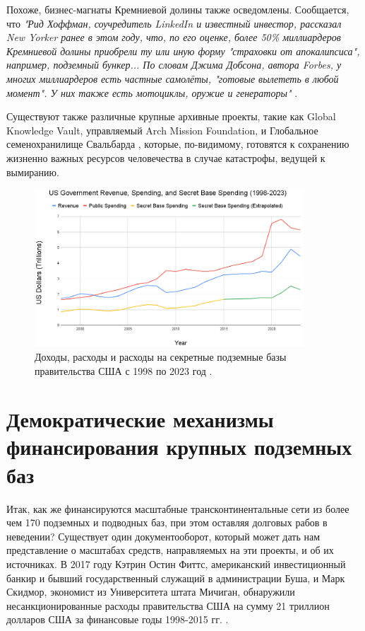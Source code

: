 \documentclass[10pt,twocolumn,letterpaper]{article}
\begin{document}
Похоже, бизнес-магнаты Кремниевой долины также осведомлены. Сообщается, что \textit{"Рид Хоффман, соучредитель LinkedIn и известный инвестор, рассказал New Yorker ранее в этом году, что, по его оценке, более 50\% миллиардеров Кремниевой долины приобрели ту или иную форму "страховки от апокалипсиса", например, подземный бункер... По словам Джима Добсона, автора Forbes, у многих миллиардеров есть частные самолёты, "готовые вылететь в любой момент". У них также есть мотоциклы, оружие и генераторы"} \cite{28}.

Существуют также различные крупные архивные проекты, такие как Global Knowledge Vault, управляемый Arch Mission Foundation, \cite{29} и Глобальное семенохранилище Свальбарда \cite{30}, которые, по-видимому, готовятся к сохранению жизненно важных ресурсов человечества в случае катастрофы, ведущей к вымиранию.
\begin{figure}[t]
\begin{center}
\includegraphics[width=0.9\textwidth]{govcrop2.png}
\end{center}
   \caption{Доходы, расходы и расходы на секретные подземные базы правительства США с 1998 по 2023 год \cite{19}.}
   \label{fig:9}
\end{figure}

\section{Демократические механизмы финансирования крупных подземных баз}

Итак, как же финансируются масштабные трансконтинентальные сети из более чем 170 подземных и подводных баз, при этом оставляя долговых рабов в неведении? Существует один документооборот, который может дать нам представление о масштабах средств, направляемых на эти проекты, и об их источниках. В 2017 году Кэтрин Остин Фиттс, американский инвестиционный банкир и бывший государственный служащий в администрации Буша, и Марк Скидмор, экономист из Университета штата Мичиган, обнаружили несанкционированные расходы правительства США на сумму 21 триллион долларов США за финансовые годы 1998-2015 гг. \cite{11,12,13}.
\end{document}
